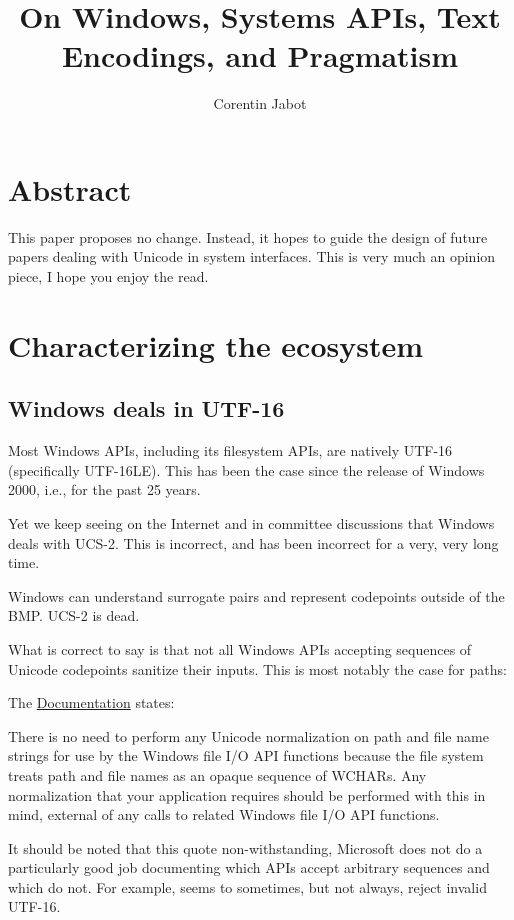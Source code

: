\documentclass{wg21}
\title{On Windows, Systems APIs, Text Encodings, and Pragmatism}
\author{Corentin Jabot}{corentin.jabot@gmail.com}
\begin{document}
\maketitle

\section{Abstract}

This paper proposes no change. Instead, it hopes to guide the design of future papers dealing with Unicode in system interfaces.
This is very much an opinion piece, I hope you enjoy the read.

\section{Characterizing the ecosystem}

\subsection{Windows deals in UTF-16}

Most Windows APIs, including its filesystem APIs, are natively UTF-16 (specifically UTF-16LE).
This has been the case since the release of Windows 2000, i.e., for the past 25 years.

Yet we keep seeing on the Internet and in committee discussions that Windows deals with UCS-2. This is incorrect, and
has been incorrect for a very, very long time.

Windows can understand surrogate pairs and represent codepoints outside of the BMP. UCS-2 is dead.

What is correct to say is that not all Windows APIs accepting sequences of Unicode codepoints sanitize their inputs.
This is most notably the case for paths:

The \href{https://learn.microsoft.com/en-us/windows/win32/fileio/maximum-file-path-limitation?tabs=registry}{Documentation} states:
\begin{quoteblock}
There is no need to perform any Unicode normalization on path and file name strings for use by the Windows file I/O API functions because the file system treats path and file names as an opaque sequence of WCHARs. Any normalization that your application requires should be performed with this in mind, external of any calls to related Windows file I/O API functions.
\end{quoteblock}

It should be noted that this quote non-withstanding, Microsoft does not do a particularly good job documenting which APIs accept arbitrary 
sequences and which do not. For example,  seems to sometimes, but not always, reject invalid UTF-16.
\end{document}
